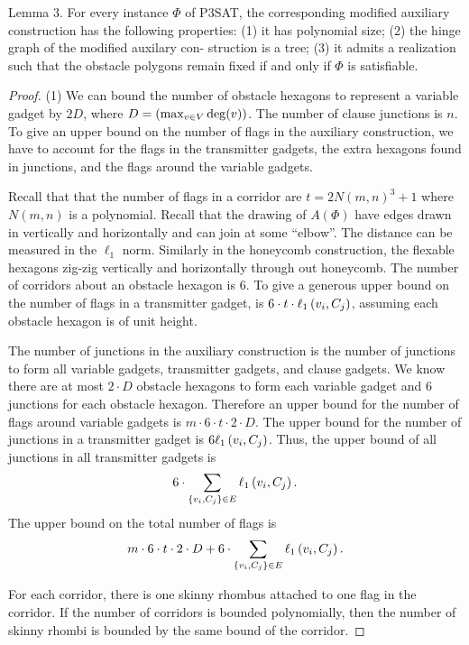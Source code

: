 \begin{lem}\label{lem:lePieceDuResistance}
Lemma 3. For every instance $\Phi$ of P3SAT, the corresponding modified auxiliary construction
has the following properties: (1) it has polynomial size; (2) the hinge graph of the modified auxilary con-
struction is a tree; (3) it admits a realization such that the obstacle polygons remain fixed if and only if $\Phi$ is
satisfiable.
\end{lem}
\begin{proof}
\noindent (1) We can bound the number of obstacle hexagons to represent a variable gadget by $2 D$, where $D = \left(  \max_{v \in V} \deg (v) \right)$.  
The number of clause junctions is $n$.
To give an upper bound on the number of flags in the auxiliary construction, we have to account for the flags in the transmitter gadgets, the extra hexagons found in junctions, and the flags around the variable gadgets.

Recall that that the number of flags in a corridor are $ t = 2N(m,n)^3 + 1 $ where $N(m,n)$ is a polynomial. 
Recall that the drawing of $A(\Phi)$ have edges drawn in vertically and horizontally and can join at some ``elbow''.  
The distance can be measured in the $\ell_1$ norm.
Similarly in the honeycomb construction, the flexable hexagons zig-zig vertically and horizontally through out honeycomb.  
The number of corridors about an obstacle hexagon is $6$.
To give a generous upper bound on the number of flags in a transmitter gadget, is $6 \cdot t \cdot \ell_1\left( v_i,C_j \right)$, assuming each obstacle hexagon is of unit height.

The number of junctions in the auxiliary construction is the number of junctions to form all variable gadgets, transmitter gadgets, and clause gadgets. 
We know there are at most $2 \cdot D$ obstacle hexagons to form each variable gadget and $6$ junctions for each obstacle hexagon.  
Therefore an upper bound for the number of flags around variable gadgets is $m \cdot 6 \cdot t \cdot 2 \cdot D$.
The upper bound for the number of junctions in a transmitter gadget is $6 \ell_1 \left( v_i, C_j \right)$.  
Thus, the upper bound of all junctions in all transmitter gadgets is $$6 \cdot \sum_{\left\lbrace v_i, C_j \right\rbrace \in E} \ell_1 \left( v_i, C_j \right).$$
The upper bound on the total number of flags is
$$m \cdot 6 \cdot t \cdot 2 \cdot D + 6 \cdot \sum_{\left\lbrace v_i, C_j \right\rbrace \in E} \ell_1 \left( v_i, C_j \right).$$

For each corridor, there is one skinny rhombus attached to one flag in the corridor.  If the number of corridors is bounded polynomially, then the number of skinny rhombi is bounded by the same bound of the corridor.


\end{proof}
